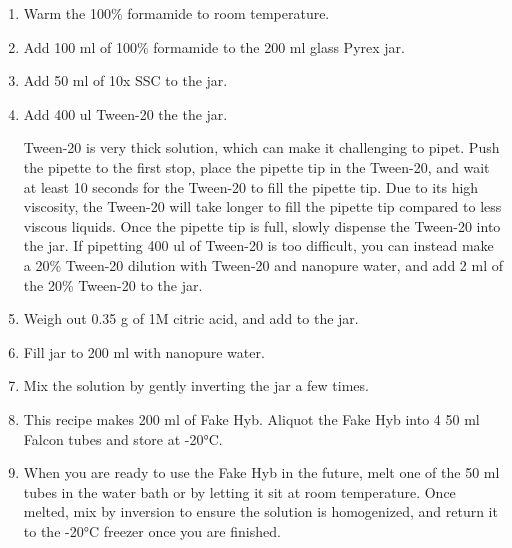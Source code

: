 \documentclass[
  letterpaper,
  DIV=11,
  numbers=noendperiod]{scrreprt}
\begin{document}
\begin{enumerate}
\def\labelenumi{\arabic{enumi}.}
\item
  Warm the 100\% formamide to room temperature.
\item
  Add 100 ml of 100\% formamide to the 200 ml glass Pyrex jar.
\item
  Add 50 ml of 10x SSC to the jar.
\item
  Add 400 ul Tween-20 the the jar.

  \begin{tcolorbox}[enhanced jigsaw, toprule=.15mm, breakable, coltitle=black, leftrule=.75mm, title=\textcolor{quarto-callout-important-color}{\faExclamation}\hspace{0.5em}{NOTE}, bottomrule=.15mm, toptitle=1mm, bottomtitle=1mm, colframe=quarto-callout-important-color-frame, opacityback=0, colback=white, opacitybacktitle=0.6, colbacktitle=quarto-callout-important-color!10!white, rightrule=.15mm, titlerule=0mm, arc=.35mm, left=2mm]

  Tween-20 is very thick solution, which can make it challenging to
  pipet. Push the pipette to the first stop, place the pipette tip in
  the Tween-20, and wait at least 10 seconds for the Tween-20 to fill
  the pipette tip. Due to its high viscosity, the Tween-20 will take
  longer to fill the pipette tip compared to less viscous liquids. Once
  the pipette tip is full, slowly dispense the Tween-20 into the jar. If
  pipetting 400 ul of Tween-20 is too difficult, you can instead make a
  20\% Tween-20 dilution with Tween-20 and nanopure water, and add 2 ml
  of the 20\% Tween-20 to the jar.

  \end{tcolorbox}
\item
  Weigh out 0.35 g of 1M citric acid, and add to the jar.
\item
  Fill jar to 200 ml with nanopure water.
\item
  Mix the solution by gently inverting the jar a few times.
\item
  This recipe makes 200 ml of Fake Hyb. Aliquot the Fake Hyb into 4 50
  ml Falcon tubes and store at -20°C.
\item
  When you are ready to use the Fake Hyb in the future, melt one of the
  50 ml tubes in the water bath or by letting it sit at room
  temperature. Once melted, mix by inversion to ensure the solution is
  homogenized, and return it to the -20°C freezer once you are finished.
\end{enumerate}
\end{document}
